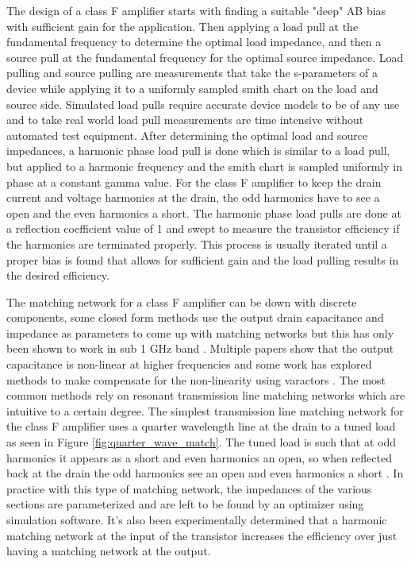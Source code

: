 The design of a class F amplifier starts with finding a suitable "deep" AB bias with sufficient gain for the application. Then applying a load pull at the fundamental frequency to determine the optimal load impedance, and then a source pull at the fundamental frequency for the optimal source impedance. Load pulling and source pulling are measurements that take the s-parameters of a device while applying it to a uniformly sampled smith chart on the load and source side. Simulated load pulls require accurate device models to be of any use and to take real world load pull measurements are time intensive without automated test equipment. After determining the optimal load and source impedances, a harmonic phase load pull is done which is similar to a load pull, but applied to a harmonic frequency and the smith chart is sampled uniformly in phase at a constant gamma value. For the class F amplifier to keep the drain current and voltage harmonics at the drain, the odd harmonics have to see a open and the even harmonics a short.%
The harmonic phase load pulls are done at a reflection coefficient value of 1 and swept to measure the transistor efficiency if the harmonics are terminated properly. This process is usually iterated until a proper bias is found that allows for sufficient gain and the load pulling results in the desired efficiency.

The matching network for a class F amplifier can be down with discrete components, some closed form methods use the output drain capacitance and impedance as parameters to come up with matching networks but this has only been shown to work in sub 1 GHz band \cite{Grebennikov2000}. Multiple papers show that the output capacitance is non-linear at higher frequencies and some work has explored methods to make compensate for the non-linearity using varactors \cite{Kye-Ik1997}. The most common methods rely on resonant transmission line matching networks which are intuitive to a certain degree. The simplest transmission line matching network for the class F amplifier uses a quarter wavelength line at the drain to a tuned load as seen in Figure \ref{fig:quarter_wave_match}. The tuned load is such that at odd harmonics it appears as a short and even harmonics an open, so when reflected back at the drain the odd harmonics see an open and even harmonics a short \cite{Gao2006}. In practice with this type of matching network, the impedances of the various sections are parameterized and are left to be found by an optimizer using simulation software. It's also been experimentally determined that a harmonic matching network at the input of the transistor increases the efficiency over just having a matching network at the output. %

